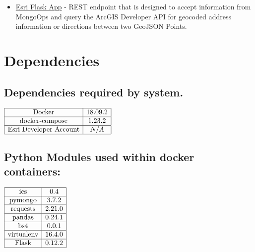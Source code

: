 \begin{itemize}
\begin{itemize}
    \item \href{https://github.com/apjansing/Open-House-Route-Planner/blob/master/backend/docker/persistence/esri/esri_flask.py}{Esri Flask App} - REST endpoint that is designed to accept information from MongoOps and query the ArcGIS Developer API for geocoded address information or directions between two GeoJSON Points.
    
  \end{itemize}
\end{itemize}

\section{Dependencies}
\subsection{Dependencies required by system.}
$
\begin{array}{|c|c|}
  \hline
  \text{Docker} & 18.09.2 \\\hline
  \text{docker-compose} & 1.23.2 \\\hline
  \text{Esri Developer Account} & N/A \\
  \hline
\end{array}
$

\subsection{Python Modules used within docker containers:}
$
\begin{array}{|c|c|}
  \hline
  \text{ics} & 0.4\\\hline
  \text{pymongo} & 3.7.2 \\\hline
  \text{requests} & 2.21.0 \\\hline
  \text{pandas} & 0.24.1 \\\hline
  \text{bs4} & 0.0.1 \\\hline
  \text{virtualenv} & 16.4.0 \\\hline
  \text{Flask} & 0.12.2 \\
  \hline
\end{array}
$